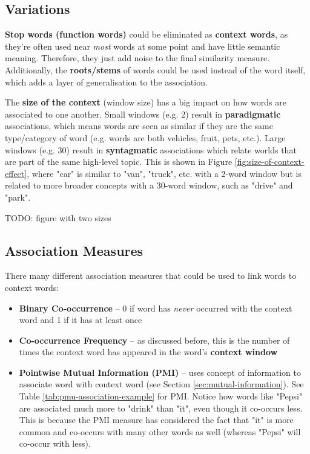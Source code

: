 \documentclass{article}
\begin{document}
\subsection{Variations}

\textbf{Stop words (function words)} could be eliminated as \textbf{context words}, as they're often used near \textit{most} words at some point and have little semantic meaning. Therefore, they just add noise to the final similarity measure. Additionally, the \textbf{roots/stems} of words could be used instead of the word itself, which adds a layer of generalisation to the association.

The \textbf{size of the context} (window size) has a big impact on how words are associated to one another. Small windows (e.g. 2) result in \textbf{paradigmatic} associations, which means words are seen as similar if they are the same type/category of word (e.g. words are both vehicles, fruit, pets, etc.). Large windows (e.g. 30) result in \textbf{syntagmatic} associations which relate worlds that are part of the same high-level topic. This is shown in Figure \ref{fig:size-of-context-effect}, where "car" is similar to "van", "truck", etc. with a 2-word window but is related to more broader concepts with a 30-word window, such as "drive" and "park".

TODO: figure with two sizes

\subsection{Association Measures}
\label{sec:association-measures}

There many different association measures that could be used to link words to context words:
\begin{itemize}
	\item \textbf{Binary Co-occurrence} -- 0 if word has \textit{never} occurred with the context word and 1 if it has at least once
	\item \textbf{Co-occurrence Frequency} -- as discussed before, this is the number of times the context word has appeared in the word's \textbf{context window}
	\item \textbf{Pointwise Mutual Information (PMI)} -- uses concept of information to associate word with context word (see Section \ref{sec:mutual-information}). See Table \ref{tab:pmu-association-example} for PMI. Notice how words like "Pepsi" are associated much more to "drink" than "it", even though it co-occurs less. This is because the PMI measure has considered the fact that "it" is more common and co-occurs with many other words as well (whereas "Pepsi" will co-occur with less).
\end{itemize}
\end{document}
